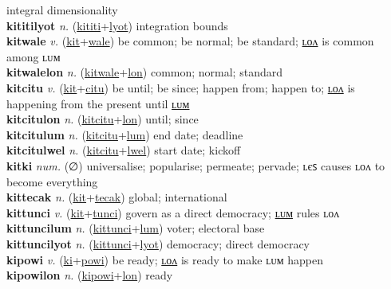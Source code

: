integral dimensionality \label{kititilyan} \\
\textbf{kititilyot} \textit{n.} (\hyperref[kititi]{kititi}+\hyperref[lyot]{lyot})
integration bounds \label{kititilyot} \\
\textbf{kitwale} \textit{v.} (\hyperref[kit]{kit}+\hyperref[wale]{wale})
be common; be normal; be standard; \hyperref[kitwalelon]{ʟᴏᴧ} is common among ʟᴜᴍ \label{kitwale} \\
\textbf{kitwalelon} \textit{n.} (\hyperref[kitwale]{kitwale}+\hyperref[lon]{lon})
common; normal; standard \label{kitwalelon} \\
\textbf{kitcitu} \textit{v.} (\hyperref[kit]{kit}+\hyperref[citu]{citu})
be until; be since; happen from; happen to; \hyperref[kitcitulon]{ʟᴏᴧ} is happening from the present until \hyperref[kitcitulum]{ʟᴜᴍ} \label{kitcitu} \\
\textbf{kitcitulon} \textit{n.} (\hyperref[kitcitu]{kitcitu}+\hyperref[lon]{lon})
until; since \label{kitcitulon} \\
\textbf{kitcitulum} \textit{n.} (\hyperref[kitcitu]{kitcitu}+\hyperref[lum]{lum})
end date; deadline \label{kitcitulum} \\
\textbf{kitcitulwel} \textit{n.} (\hyperref[kitcitu]{kitcitu}+\hyperref[lwel]{lwel})
start date; kickoff \label{kitcitulwel} \\
\textbf{kitki} \textit{num.} (∅)
universalise; popularise; permeate; pervade; ʟєꜱ causes ʟᴏᴧ to become everything \label{kitki} \\
\textbf{kittecak} \textit{n.} (\hyperref[kit]{kit}+\hyperref[tecak]{tecak})
global; international \label{kittecak} \\
\textbf{kittunci} \textit{v.} (\hyperref[kit]{kit}+\hyperref[tunci]{tunci})
govern as a direct democracy; \hyperref[kittuncilum]{ʟᴜᴍ} rules ʟᴏᴧ \label{kittunci} \\
\textbf{kittuncilum} \textit{n.} (\hyperref[kittunci]{kittunci}+\hyperref[lum]{lum})
voter; electoral base \label{kittuncilum} \\
\textbf{kittuncilyot} \textit{n.} (\hyperref[kittunci]{kittunci}+\hyperref[lyot]{lyot})
democracy; direct democracy \label{kittuncilyot} \\
\textbf{kipowi} \textit{v.} (\hyperref[ki]{ki}+\hyperref[powi]{powi})
be ready; \hyperref[kipowilon]{ʟᴏᴧ} is ready to make ʟᴜᴍ happen \label{kipowi} \\
\textbf{kipowilon} \textit{n.} (\hyperref[kipowi]{kipowi}+\hyperref[lon]{lon})
ready \label{kipowilon} \\
